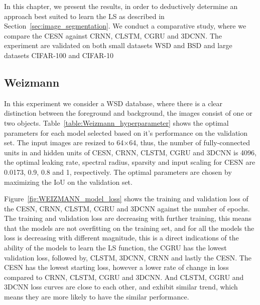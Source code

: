 \documentclass{WitsPhysicsReport}
\begin{document}
In this chapter, we present the results, in order to deductively determine an approach best suited to learn the LS as described in Section~\ref{sec:image_segmentation}. We conduct a comparative study, where we compare the CESN against CRNN, CLSTM, CGRU and 3DCNN. The experiment are validated on both small datasets WSD and BSD and large datasets CIFAR-100 and CIFAR-10



\subsection{Weizmann}
In this experiment we consider a WSD database, where there is a clear distinction between the foreground and background, the images consist of one or two objects. Table~\ref{table:Weizmann_hyperparameter} shows the optimal parameters for each model selected based on it's performance on the validation set. The input images are resized to 64$\times$64, thus, the number of fully-connected units in and hidden units of CESN, CRNN, CLSTM, CGRU and 3DCNN is 4096, the optimal leaking rate, spectral radius, sparsity and input scaling for CESN are 0.0173, 0.9, 0.8 and 1, respectively. The optimal parameters are chosen by maximizing the IoU on the validation set.

\begin{table}[H]
    \centering
    \caption{WSD dataset optimal parameters for the CESN, CRNN, CLSTM, CGRU and 3DCNN}
    \label{table:Weizmann_hyperparameter}
\end{table}

Figure~\ref{fig:WEIZMANN_model_loss} shows the training and validation loss of the CESN, CRNN, CLSTM, CGRU and 3DCNN against the number of epochs. The training and validation loss are decreasing with further training, this means that the models are not overfitting on the training set,  and for all the models the loss is decreasing with different magnitude, this is a direct indications of the ability of the models to learn the LS function, the CGRU has the lowest validation loss, followed by, CLSTM, 3DCNN, CRNN and lastly the CESN. The CESN has the lowest starting loss, however a lower rate of change in loss compared to CRNN, CLSTM, CGRU and 3DCNN. And CLSTM, CGRU and 3DCNN loss curves are close to each other, and exhibit similar trend, which means they are more likely to have the similar performance.
\end{document}
